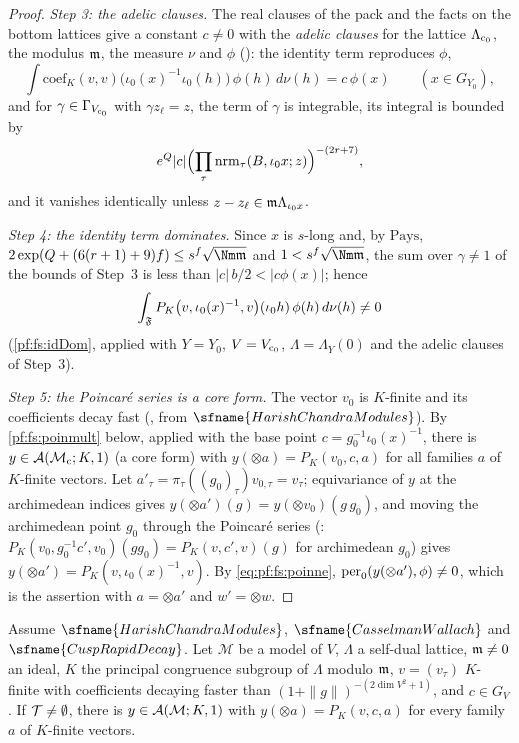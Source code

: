 \begin{proof}
\emph{Step 3: the adelic clauses.} The real clauses of the pack and the facts on the bottom lattices give a constant $c\ne0$ with
the \emph{adelic clauses} for the lattice $\Lambda_{\mathrm{c}_0}$, the modulus $\mathfrak m$, the measure $\nu$ and $\phi$
(): the identity term reproduces $\phi$,
\begin{equation}\label{eq:pf:fs:idterm}
\int\mathrm{coef}_K(v,v)\bigl(\iota_0(x)^{-1}\iota_0(h)\bigr)\,\phi(h)\,d\nu(h)=c\,\phi(x)\qquad(x\in G_{Y_0}),
\end{equation}
and for $\gamma\in\Gamma_{V_{\mathrm{c}_0}}$ with $\gamma z_\ell=z$, the term of $\gamma$ is integrable, its integral is bounded by
\[
e^Q|c|\Bigl(\prod_\tau\mathrm{nrm}_\tau(B,\iota_0x;z)\Bigr)^{-(2r+7)},
\]
and it vanishes identically unless $z-z_\ell\in\mathfrak m\Lambda_{\iota_0x}$.

\emph{Step 4: the identity term dominates.} Since $x$ is $s$-long and, by $\mathrm{Pays}$,
$2\exp(Q+(6(r+1)+9)f)\le s^f\sqrt{\Nm\fsm}$ and $1<s^f\sqrt{\Nm\fsm}$, the sum over $\gamma\ne1$ of the bounds of Step~3 is less
than $|c|\,b/2<|c\phi(x)|$; hence
\begin{equation}\label{eq:pf:fs:poinne}
\int_{\mathfrak F}P_K\bigl(v,\iota_0(x)^{-1},v\bigr)(\iota_0h)\,\phi(h)\,d\nu(h)\neq0
\end{equation}
(\cref{pf:fs:idDom}, applied with $Y=Y_0$, $V=V_{\mathrm{c}_0}$, $\Lambda=\Lambda_Y(0)$ and the adelic clauses of Step~3).

\emph{Step 5: the Poincar\'e series is a core form.} The vector $v_0$ is $K$-finite and its coefficients decay fast
(, from $\sfname{HarishChandraModules}$). By
\cref{pf:fs:poinmult} below, applied with the base point $c=g_0^{-1}\iota_0(x)^{-1}$, there is $y\in\mathcal A(\mathcal M_{\mathrm{c}};K,1)$ (a
core form) with $y(\otimes a)=P_K(v_0,c,a)$ for all families $a$ of $K$-finite vectors. Let $a'_\tau=\pi_\tau((g_0)_\tau)v_{0,\tau}=v_\tau$;
equivariance of $y$ at the archimedean indices gives $y(\otimes a')(g)=y(\otimes v_0)(g\,g_0)$, and moving the archimedean point $g_0$
through the Poincar\'e series (:
$P_K(v_0,g_0^{-1}c',v_0)(gg_0)=P_K(v,c',v)(g)$ for archimedean $g_0$) gives $y(\otimes a')=P_K(v,\iota_0(x)^{-1},v)$. By
\eqref{eq:pf:fs:poinne}, $\mathrm{per}_0(y(\otimes a'),\phi)\ne0$, which is the assertion with $a=\otimes a'$ and $w'=\otimes w$.
\end{proof}

\begin{lemma}\label{pf:fs:poinmult}\sloppy
Assume $\sfname{HarishChandraModules}$, $\sfname{CasselmanWallach}$ and $\sfname{CuspRapidDecay}$. Let $\mathcal M$ be a model of $V$,
$\Lambda$ a self-dual lattice, $\mathfrak m\ne0$ an ideal, $K$ the principal congruence subgroup of $\Lambda$ modulo $\mathfrak m$,
$v=(v_\tau)$ $K$-finite with coefficients decaying faster than $(1+\|g\|)^{-(2\dim V^2+1)}$, and $c\in G_V$. If $\mathcal T\ne\emptyset$,
there is $y\in\mathcal A(\mathcal M;K,1)$ with $y(\otimes a)=P_K(v,c,a)$ for every family $a$ of $K$-finite vectors.
\end{lemma}


